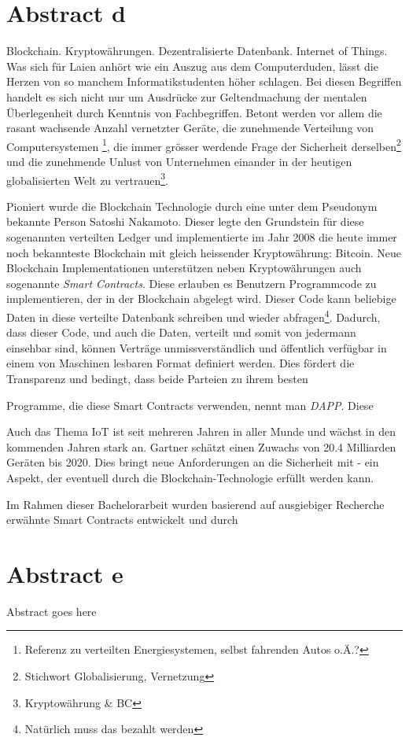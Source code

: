 \chapter{Abstract d}
\label{cha:abstract_d}

Blockchain. Kryptowährungen. Dezentralisierte Datenbank. Internet of Things. Was sich für Laien anhört wie ein Auszug aus dem Computerduden, lässt die Herzen von so manchem Informatikstudenten höher schlagen. Bei diesen Begriffen handelt es sich nicht nur um Ausdrücke zur Geltendmachung der mentalen Überlegenheit durch Kenntnis von Fachbegriffen. Betont werden vor allem die rasant wachsende Anzahl vernetzter Geräte, die zunehmende Verteilung von Computersystemen \footnote{Referenz zu verteilten Energiesystemen, selbst fahrenden Autos o.Ä.?}, die immer grösser werdende Frage der Sicherheit derselben\footnote{Stichwort Globalisierung, Vernetzung} und die zunehmende Unlust von Unternehmen einander in der heutigen globalisierten Welt zu vertrauen\footnote{Kryptowährung \& BC}.

Pioniert wurde die Blockchain Technologie durch eine unter dem Pseudonym bekannte Person Satoshi Nakamoto. Dieser legte den Grundstein für diese sogenannten verteilten Ledger und implementierte im Jahr 2008 die heute immer noch bekannteste Blockchain mit gleich heissender Kryptowährung: Bitcoin. Neue Blockchain Implementationen unterstützen neben Kryptowährungen auch sogenannte \emph{Smart Contracts}. Diese erlauben es Benutzern Programmcode zu implementieren, der in der Blockchain abgelegt wird. Dieser Code kann beliebige Daten in diese verteilte Datenbank schreiben und wieder abfragen\footnote{Natürlich muss das bezahlt werden}. Dadurch, dass dieser Code, und auch die Daten, verteilt und somit von jedermann einsehbar sind, können Verträge unmissverständlich und öffentlich verfügbar in einem von Maschinen lesbaren Format definiert werden. Dies fördert die Transparenz und bedingt, dass beide Parteien zu ihrem besten 

Programme, die diese Smart Contracts verwenden, nennt man \emph{\acrfull{DAPP}}. Diese 


\cite{BlockchainRevolution}

Auch das Thema \acrshort{IoT} ist seit mehreren Jahren in aller Munde und wächst in den kommenden Jahren stark an. Gartner schätzt einen Zuwachs von 20.4 Milliarden Geräten bis 2020. Dies bringt neue Anforderungen an die Sicherheit mit - ein Aspekt, der eventuell durch die Blockchain-Technologie erfüllt werden kann.\cite{gartner.com_iot,BlockchainRevolution}

Im Rahmen dieser Bachelorarbeit wurden basierend auf ausgiebiger Recherche erwähnte Smart Contracts entwickelt und durch 


\chapter{Abstract e}
\label{cha:abstract_e}

Abstract goes here
